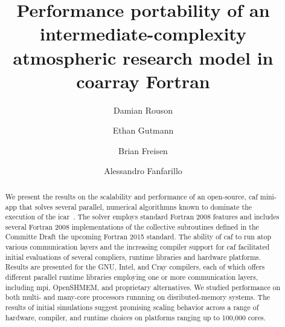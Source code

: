 \documentclass[sigconf, authordraft]{acmart}
\begin{document}
\title{Performance portability of an intermediate-complexity atmospheric research model in coarray Fortran}

\author{Damian Rouson}
\renewcommand{\shortauthors}{D. Rouson et al.}

\author{Ethan Gutmann}

\author{Brian Freisen}

\author{Alessandro Fanfarillo}

\begin{abstract}
We present the results on the scalability and performance of an open-source, \gls{caf} \gls{mini-app} that solves
several parallel, numerical algorithmns known to dominate the execution of the \gls{icar}~\cite{gutmann2016intermediate}.
The solver employs standard Fortran 2008 features and includes several Fortran 2008 implementations of the collective
subroutines defined in the Committe Draft the upcoming Fortran 2015 standard.  The ability of \gls{caf} to run atop various
communication layers and the increasing compiler support for \gls{caf} facilitated initial evaluations of several compliers,
runtime libraries and hardware platforms.  Results are presented for the GNU, Intel, and Cray compilers, each of which offers
different parallel runtime libraries employing one or more communication layers, including \gls{mpi}, OpenSHMEM, and proprietary
alternatives.  We studied performance on both multi- and many-core processors runnning on disributed-memory systems.  The
results of initial simulations suggest promising scaling behavior across a range of hardware, compiler, and runtime choices
on platforms ranging up to 100,000 cores.
\end{abstract}
\end{document}
